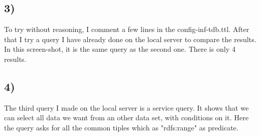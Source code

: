 \documentclass{article}
\begin{document}
	\subsection{3) }
		To try without reasoning, I comment a few lines in the config-inf-tdb.ttl.
		After that I try a query I have already done on the local server to compare the results.
		In this screen-shot, it is the same query as the second one.
		There is only 4 results.\\
		\newline
	\subsection{4) }
		The third query I made on the local server is a service query.
		It shows that we can select all data we want from an other data set, with conditions on it.
		Here the query asks for all the common tiples which as "rdfs:range" as predicate.
\end{document}
